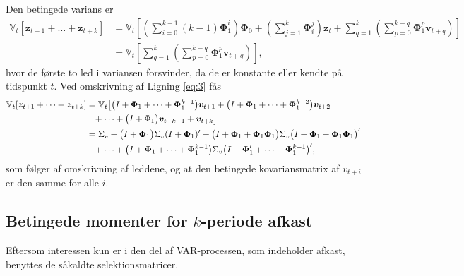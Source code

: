 \documentclass[
  a4paper,
  oneside]{memoir}
\begin{document}
\vspace{5mm}

Den betingede varians er
\begin{align}
        \mathbb{V}_t[\bm{z}_{t+1}+\dots+\bm{z}_{t+k}]
        &=\mathbb{V}_t\left[\left(\sum_{i=0}^{k-1}(k-1)\bm{\Phi}_1^i\right)\bm{\Phi}_0+\left(\sum_{j=1}^k \bm{\Phi}_i^j\right)\bm{z}_t +\sum_{q=1}^k\left(\sum_{p=0}^{k-q}\bm{\Phi}_1^p \bm{v}_{t+q}\right)\right] \nonumber\\
        &=\mathbb{V}_t\left[\sum_{q=1}^k\left(\sum_{p=0}^{k-q} \bm{\Phi}_1^p \bm{v}_{t+q}\right)\right] \label{eq:3},
    \end{align}
hvor de første to led i variansen forsvinder, da de er konstante eller kendte på tidspunkt \(t\). Ved omskrivning af Ligning \eqref{eq:3} fås
\begin{align*}
        \mathbb{V}_t[\bm{z}_{t+1}+\dots+\bm{z}_{t+k}]&=\mathbb{V}_t\big[\big(I+\bm{\Phi}_1+\dots+\bm{\Phi}_1^{k-1}\big)\bm{v}_{t+1}+\big(I+\bm{\Phi}_1+\dots+\bm{\Phi}_1^{k-2}\big)\bm{v}_{t+2}\\
        &\hphantom{=}+\dots+\big(I+\Phi_1\big)\bm{v}_{t+k-1}+\bm{v}_{t+k}\big]\\
        &=\Sigma_v+\big(I+\bm{\Phi}_1\big)\Sigma_v(I+\bm{\Phi}_1)'+\big(I+\bm{\Phi}_1+\bm{\Phi}_1\bm{\Phi}_1\big)\Sigma_v\big(I+\bm{\Phi}_1+\bm{\Phi}_1\bm{\Phi}_1\big)'\\
        &\hphantom{=}+\dots+\big(I+\bm{\Phi}_1+\dots+\bm{\Phi}_1^{k-1}\big)\Sigma_v\big(I+\bm{\Phi}_1'+\dots+\bm{\Phi}_1^{k-1}\big)',
    \end{align*}
som følger af omskrivning af leddene, og at den betingede kovariansmatrix af \(v_{t+i}\) er den samme for alle \(i\).

\subsection{Betingede momenter for $k$-periode afkast}

Eftersom interessen kun er i den del af VAR-processen, som indeholder afkast, benyttes de såkaldte selektionsmatricer.
\end{document}
